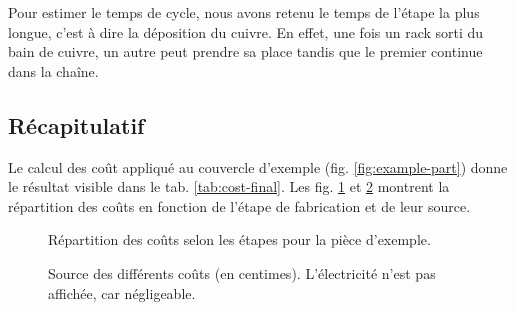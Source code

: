 Pour estimer le temps de cycle, nous avons retenu le temps de l'étape la plus longue, c'est à dire la déposition du cuivre.
En effet, une fois un rack sorti du bain de cuivre, un autre peut prendre sa place tandis que le premier continue dans la chaîne.



\clearpage %
\subsection{Récapitulatif}
Le calcul des coût appliqué au couvercle d'exemple (fig. \ref{fig:example-part}) donne le résultat visible dans le tab. \ref{tab:cost-final}.
Les fig. \ref{fig:cost-repartition} et \ref{fig:cost-repartition-b} montrent la répartition des coûts en fonction de l'étape de fabrication et de leur source.



\begin{figure}[p!]
    \begin{center}
        \caption{Répartition des coûts selon les étapes pour la pièce d'exemple.}\label{fig:cost-repartition}
    \end{center}
\end{figure}

\begin{figure}[p!]
    \begin{center}
        \caption{Source des différents coûts (en centimes). L'électricité n'est pas affichée, car négligeable.}
        \label{fig:cost-repartition-b}
    \end{center}
\end{figure}

